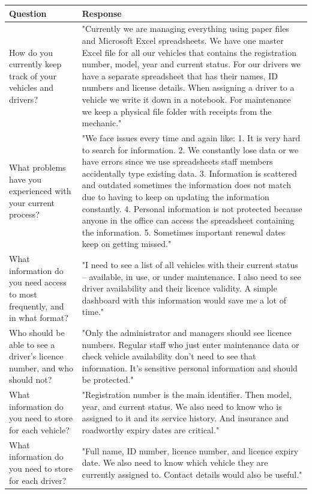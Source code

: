 \documentclass[11pt,a4paper]{article}
\begin{document}
\begin{longtable}{@{}p{6.5cm}p{7.8cm}@{}}
\toprule
Question & Response \\
\midrule
\endhead
How do you currently keep track of your vehicles and drivers? & "Currently we are managing everything using paper files and Microsoft Excel spreadsheets. We have one master Excel file for all our vehicles that contains the registration number, model, year and current status. For our drivers we have a separate spreadsheet that has their names, ID numbers and license details. When assigning a driver to a vehicle we write it down in a notebook. For maintenance we keep a physical file folder with receipts from the mechanic." \\
What problems have you experienced with your current process? & "We face issues every time and again like: 1. It is very hard to search for information. 2. We constantly lose data or we have errors since we use spreadsheets staff members accidentally type existing data. 3. Information is scattered and outdated sometimes the information does not match due to having to keep on updating the information constantly. 4. Personal information is not protected because anyone in the office can access the spreadsheet containing the information. 5. Sometimes important renewal dates keep on getting missed." \\
What information do you need access to most frequently, and in what format? & "I need to see a list of all vehicles with their current status -- available, in use, or under maintenance. I also need to see driver availability and their licence validity. A simple dashboard with this information would save me a lot of time." \\
Who should be able to see a driver's licence number, and who should not? & "Only the administrator and managers should see licence numbers. Regular staff who just enter maintenance data or check vehicle availability don't need to see that information. It's sensitive personal information and should be protected." \\
What information do you need to store for each vehicle? & "Registration number is the main identifier. Then model, year, and current status. We also need to know who is assigned to it and its service history. And insurance and roadworthy expiry dates are critical." \\
What information do you need to store for each driver? & "Full name, ID number, licence number, and licence expiry date. We also need to know which vehicle they are currently assigned to. Contact details would also be useful." \\

\end{longtable}
\end{document}
